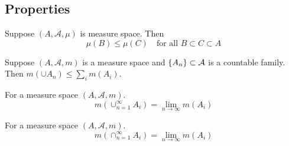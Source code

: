 \subsection*{Properties}

\begin{proposition}[monotonicity]
Suppose $(A, \mathcal{A} , \mu )$ is measure space.
Then
\[
\mu (B) \leq \mu (C) \quad \text{for all } B \subset C \subset A
\]
\end{proposition}

\begin{proposition}[subaddivity]
Suppose $(A, \mathcal{A} , m)$ is a measure space and $\{A_n\} \subset \mathcal{A} $ is a countable family.
Then $m(\cup A_n) \leq \sum_{i} m(A_i)$.
\end{proposition}

\begin{proposition}
For a measure space $(A, \mathcal{A} , m)$.
\[
m(\cup_{n = 1}^{\infty} A_i) = \lim_{n \to \infty} m(A_i)
\]
\end{proposition}

\begin{proposition}
For a measure space $(A, \mathcal{A} , m)$.
\[
m(\cap _{n = 1}^{\infty} A_i) = \lim_{n \to \infty} m(A_i)
\]
\end{proposition}

